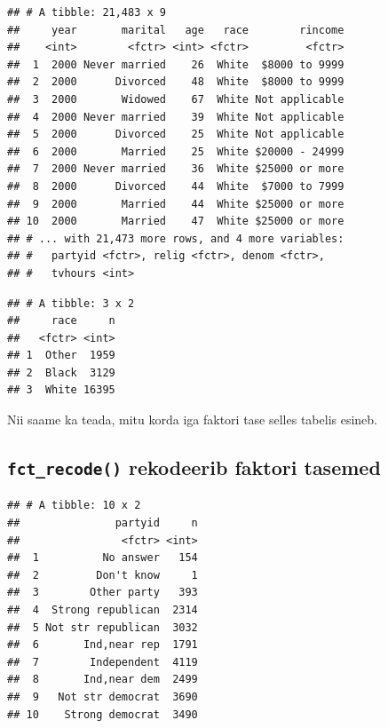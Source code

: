 \documentclass[]{book}
\newenvironment{Shaded}{\begin{snugshade}}{\end{snugshade}}
\newcommand{\KeywordTok}[1]{\textcolor[rgb]{0.13,0.29,0.53}{\textbf{#1}}}
\newcommand{\StringTok}[1]{\textcolor[rgb]{0.31,0.60,0.02}{#1}}
\newcommand{\OperatorTok}[1]{\textcolor[rgb]{0.81,0.36,0.00}{\textbf{#1}}}
\newcommand{\NormalTok}[1]{#1}
\begin{document}
\begin{verbatim}
## # A tibble: 21,483 x 9
##     year       marital   age   race        rincome
##    <int>        <fctr> <int> <fctr>         <fctr>
##  1  2000 Never married    26  White  $8000 to 9999
##  2  2000      Divorced    48  White  $8000 to 9999
##  3  2000       Widowed    67  White Not applicable
##  4  2000 Never married    39  White Not applicable
##  5  2000      Divorced    25  White Not applicable
##  6  2000       Married    25  White $20000 - 24999
##  7  2000 Never married    36  White $25000 or more
##  8  2000      Divorced    44  White  $7000 to 7999
##  9  2000       Married    44  White $25000 or more
## 10  2000       Married    47  White $25000 or more
## # ... with 21,473 more rows, and 4 more variables:
## #   partyid <fctr>, relig <fctr>, denom <fctr>,
## #   tvhours <int>
\end{verbatim}

\begin{Shaded}
\end{Shaded}

\begin{verbatim}
## # A tibble: 3 x 2
##     race     n
##   <fctr> <int>
## 1  Other  1959
## 2  Black  3129
## 3  White 16395
\end{verbatim}

Nii saame ka teada, mitu korda iga faktori tase selles tabelis esineb.

\subsection{\texorpdfstring{\texttt{fct\_recode()} rekodeerib faktori
tasemed}{fct\_recode() rekodeerib faktori tasemed}}\label{fct_recode-rekodeerib-faktori-tasemed}

\begin{Shaded}
\end{Shaded}

\begin{verbatim}
## # A tibble: 10 x 2
##               partyid     n
##                <fctr> <int>
##  1          No answer   154
##  2         Don't know     1
##  3        Other party   393
##  4  Strong republican  2314
##  5 Not str republican  3032
##  6       Ind,near rep  1791
##  7        Independent  4119
##  8       Ind,near dem  2499
##  9   Not str democrat  3690
## 10    Strong democrat  3490
\end{verbatim}
\end{document}
